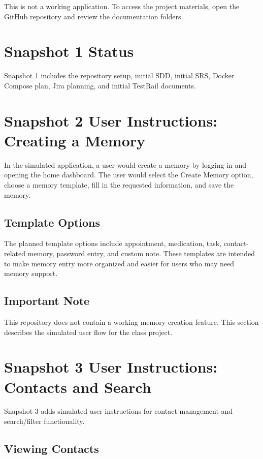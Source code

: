 \documentclass{article}
\begin{document}
This is not a working application. To access the project materials, open the GitHub repository and review the documentation folders.

\section{Snapshot 1 Status}

Snapshot 1 includes the repository setup, initial SDD, initial SRS, Docker Compose plan, Jira planning, and initial TestRail documents.

\section{Snapshot 2 User Instructions: Creating a Memory}

In the simulated application, a user would create a memory by logging in and opening the home dashboard. The user would select the Create Memory option, choose a memory template, fill in the requested information, and save the memory.

\subsection{Template Options}

The planned template options include appointment, medication, task, contact-related memory, password entry, and custom note. These templates are intended to make memory entry more organized and easier for users who may need memory support.

\subsection{Important Note}

This repository does not contain a working memory creation feature. This section describes the simulated user flow for the class project.

\section{Snapshot 3 User Instructions: Contacts and Search}

Snapshot 3 adds simulated user instructions for contact management and search/filter functionality.

\subsection{Viewing Contacts}
\end{document}

